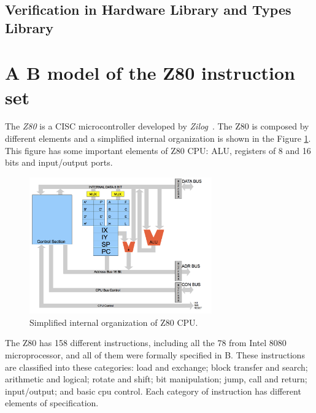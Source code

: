 \documentclass[a4paper]{llncs}
\begin{document}
\subsection{Verification in Hardware Library and Types Library} 
\label{sec:VerificationHardwareLibrary}


 





\section{A B model of the Z80 instruction set}
\label{sec:z80}

The \textit{Z80} is a CISC microcontroller developed by
\textit{Zilog}~\cite{Z80_manual}. The Z80 is composed by different elements and a
simplified internal organization is shown in the Figure \ref{fig:DiagramBlock}.
This figure has some important elements of Z80 CPU: ALU, registers of 8 and 16
bits and input/output ports.

\begin{figure}[h] \centering
\includegraphics[width=0.70\textwidth]{images/Architecture.png}
\caption{Simplified internal organization of Z80 CPU.}
\label{fig:DiagramBlock}
\end{figure}


The Z80 has 158 different instructions, including all the 78 from Intel 8080
microprocessor, and all of them were formally specified in B. These instructions are classified
into these categories: load and exchange; block transfer and search; arithmetic
and logical; rotate and shift; bit manipulation; jump, call and return;
input/output; and basic cpu control. Each category of instruction has different
elements of specification.
\end{document}
